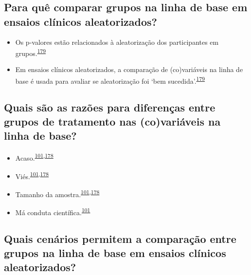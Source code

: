 \documentclass[
  a4paper,
]{book}
\begin{document}
\hypertarget{para-quuxea-comparar-grupos-na-linha-de-base-em-ensaios-cluxednicos-aleatorizados}{%
\subsection{Para quê comparar grupos na linha de base em ensaios clínicos aleatorizados?}\label{para-quuxea-comparar-grupos-na-linha-de-base-em-ensaios-cluxednicos-aleatorizados}}

\begin{itemize}
\item
  Os p-valores estão relacionados à aleatorização dos participantes em grupos.\textsuperscript{\protect\hyperlink{ref-Bolzern2019}{179}}
\item
  Em ensaios clínicos aleatorizados, a comparação de (co)variáveis na linha de base é usada para avaliar se aleatorização foi `bem sucedida'.\textsuperscript{\protect\hyperlink{ref-Bolzern2019}{179}}
\end{itemize}

\hypertarget{quais-suxe3o-as-razuxf5es-para-diferenuxe7as-entre-grupos-de-tratamento-nas-covariuxe1veis-na-linha-de-base}{%
\subsection{Quais são as razões para diferenças entre grupos de tratamento nas (co)variáveis na linha de base?}\label{quais-suxe3o-as-razuxf5es-para-diferenuxe7as-entre-grupos-de-tratamento-nas-covariuxe1veis-na-linha-de-base}}

\begin{itemize}
\item
  Acaso.\textsuperscript{\protect\hyperlink{ref-chen2020}{101},\protect\hyperlink{ref-Stang2018}{178}}
\item
  Viés.\textsuperscript{\protect\hyperlink{ref-chen2020}{101},\protect\hyperlink{ref-Stang2018}{178}}
\item
  Tamanho da amostra.\textsuperscript{\protect\hyperlink{ref-chen2020}{101},\protect\hyperlink{ref-Stang2018}{178}}
\item
  Má conduta científica.\textsuperscript{\protect\hyperlink{ref-chen2020}{101}}
\end{itemize}

\hypertarget{quais-cenuxe1rios-permitem-a-comparauxe7uxe3o-entre-grupos-na-linha-de-base-em-ensaios-cluxednicos-aleatorizados}{%
\subsection{Quais cenários permitem a comparação entre grupos na linha de base em ensaios clínicos aleatorizados?}\label{quais-cenuxe1rios-permitem-a-comparauxe7uxe3o-entre-grupos-na-linha-de-base-em-ensaios-cluxednicos-aleatorizados}}
\end{document}
